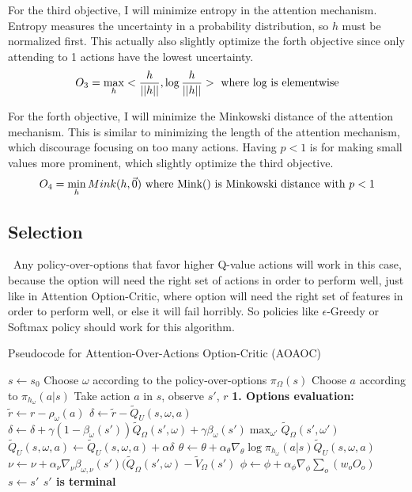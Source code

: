\documentclass{article}
\begin{document}
	\quad For the third objective, I will minimize entropy in the attention mechanism. Entropy measures the uncertainty in a probability distribution, so $h$ must be normalized first. This actually also slightly optimize the forth objective since only attending to 1 actions have the lowest uncertainty.$$O_3 = \max_h <\frac{h}{||h||},\log \frac{h}{||h||}> \textnormal{ where log is elementwise}$$
	
	\quad For the forth objective, I will minimize the Minkowski distance of the attention mechanism. This is similar to minimizing the length of the attention mechanism, which discourage focusing on too many actions. Having $p<1$ is for making small values more prominent, which slightly optimize the third objective.$$O_4 = \min_h Mink(h,\vec{0}) \textnormal{ where Mink() is Minkowski distance with } p<1$$
	
	\subsection*{Selection}
	\qquad \ Any policy-over-options that favor higher Q-value actions will work in this case, because the option will need the right set of actions in order to perform well, just like in Attention Option-Critic, where option will need the right set of features in order to perform well, or else it will fail horribly. So policies like $\epsilon$-Greedy or Softmax policy should work for this algorithm.
	
	\begin{algorithm}[H]
	\caption{Pseudocode for Attention-Over-Actions Option-Critic (AOAOC)}
	\begin{algorithmic}
		\vspace{1.5mm}
		\State $s \leftarrow s_0$
		\State Choose $\omega$ according to the policy-over-options $\pi_\Omega(s)$
		\Repeat
		\State Choose $a$ according to $\pi_{h_\omega}(a|s)$
		\State Take action $a$ in $s$, observe $s'$, $r$\vspace{3mm}
		\State \bfseries{1. Options evaluation:}
		\State $\widetilde{r}\leftarrow r-\rho_\omega(a)$
		\State $\delta \leftarrow \widetilde{r} - \widetilde{Q}_U(s,\omega,a)$
		\State $\delta \leftarrow \delta+\gamma(1-\beta_\omega(s'))\widetilde{Q}_\Omega(s',\omega)+\gamma \beta_\omega(s')\max_{\omega'}\widetilde{Q}_\Omega(s',\omega')$
		\EndIf
		\State $\widetilde{Q}_U(s,\omega,a)\leftarrow \widetilde{Q}_U(s,\omega,a) + \alpha \delta$
		\vspace{3mm}
		\State $\theta \leftarrow \theta + \alpha_\theta \nabla_\theta \log \pi_{h_\omega}(a|s)\widetilde{Q}_U(s,\omega,a)$
		\State $\nu \leftarrow \nu + \alpha_\nu \nabla_\nu \beta_{\omega,\nu}(s')(\widetilde{Q}_\Omega(s',\omega)-\widetilde{V}_\Omega(s')$
		\State \normalfont $\phi \leftarrow \phi + \alpha_\phi \nabla_\phi \sum_{o} (w_o O_o)$
		\EndIf
		\State $s \leftarrow s'$
		\Until $s'$ is terminal
		
	\end{algorithmic}
	\end{algorithm}
\end{document}
